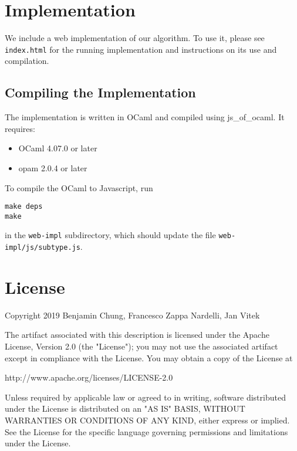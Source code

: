 \documentclass{darts-v2019}
\begin{document}
\section{Implementation}

We include a web implementation of our algorithm. To use it, please see \texttt{index.html} for
the running implementation and instructions on its use and compilation.

\subsection{Compiling the Implementation}

The implementation is written in OCaml and compiled using js\_of\_ocaml. It requires:
\begin{itemize}
\item OCaml 4.07.0 or later
\item opam 2.0.4 or later
\end{itemize}

To compile the OCaml to Javascript, run

\begin{verbatim}
make deps
make
\end{verbatim}

in the \texttt{web-impl} subdirectory, which should update the file \texttt{web-impl/js/subtype.js}.

\section{License}

Copyright 2019 Benjamin Chung, Francesco Zappa Nardelli, Jan Vitek

The artifact associated with this description is licensed under the Apache
License, Version 2.0 (the "License"); you may not use the associated artifact
except in compliance with the License. You may obtain a copy of the License at

    http://www.apache.org/licenses/LICENSE-2.0

Unless required by applicable law or agreed to in writing, software
distributed under the License is distributed on an "AS IS" BASIS,
WITHOUT WARRANTIES OR CONDITIONS OF ANY KIND, either express or implied.
See the License for the specific language governing permissions and
limitations under the License.
\end{document}

